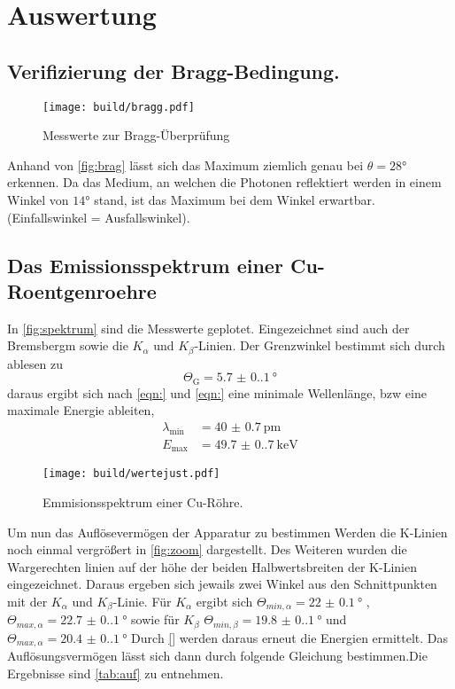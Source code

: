 \section{Auswertung}
\label{sec:Auswertung}

\subsection{Verifizierung der Bragg-Bedingung.}
\begin{figure}
    \centering
    \caption{Messwerte zur Bragg-Überprüfung}
    \label{fig:brag}
    \texttt{[image: build/bragg.pdf]}
\end{figure}
Anhand von \autoref{fig:brag} lässt sich das Maximum ziemlich genau bei 
$\theta = 28\unit{\degree}$ erkennen. Da das Medium, an welchen 
die Photonen reflektiert werden in einem Winkel von $14\unit{\degree}$ stand, 
ist das Maximum bei dem Winkel erwartbar. (Einfallswinkel = Ausfallswinkel).

\subsection{Das Emissionsspektrum einer Cu-Roentgenroehre}
In \autoref{fig:spektrum} sind die Messwerte geplotet. Eingezeichnet sind auch der Bremsbergm sowie die $K_\alpha $ und $K_\beta $-Linien.
Der Grenzwinkel bestimmt sich durch ablesen zu 
\begin{equation}
    \Theta_\text{G} = \qty{5.7(0.1)}{\degree}
\end{equation}
daraus ergibt sich nach \autoref{eqn:} und \autoref{eqn:}
eine minimale Wellenlänge, bzw eine maximale Energie ableiten,
 \begin{align}
    \lambda_\text{min} &= \qty{40(0.7)}{\pico\meter}\\
    E_\text{max} &= \qty{49.7(0.7)}{\kilo\electronvolt}
 \end{align}
\begin{figure}
    \centering
    \caption{Emmisionsspektrum einer Cu-Röhre.}
    \label{fig:spektrum}
    \texttt{[image: build/wertejust.pdf]}
\end{figure}
Um nun das Auflösevermögen der Apparatur zu bestimmen Werden die K-Linien noch einmal 
vergrößert in \autoref{fig:zoom} dargestellt. Des Weiteren wurden die Wargerechten linien 
auf der höhe der beiden Halbwertsbreiten der K-Linien eingezeichnet. Daraus ergeben sich jewails zwei 
Winkel aus den Schnittpunkten mit der $K_\alpha$ und $K_\beta$-Linie.
Für $K_\alpha$ ergibt sich $\Theta_{min,\alpha} = \qty{22(0.1)}{\degree}$ 
, $\Theta_{max,\alpha} = \qty{22.7(0.1)}{\degree}$ sowie für $K_\beta
$ $\Theta_{min,\beta} = \qty{19.8(0.1)}{\degree}$ und $\Theta_{max,\alpha} = \qty{20.4(0.1)}{\degree}$
Durch \autoref{} werden daraus erneut die Energien ermittelt. Das Auflösungsvermögen lässt sich dann 
durch folgende Gleichung bestimmen.Die Ergebnisse sind \autoref{tab:auf} zu entnehmen.

